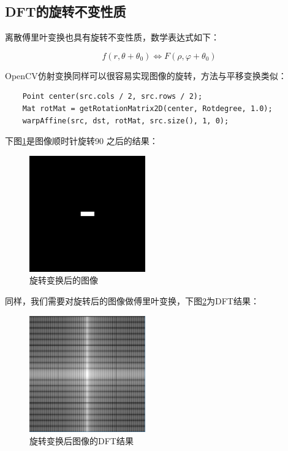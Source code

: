 \documentclass[hyperref,UTF8]{ctexart}
\begin{document}
\subsection{DFT的旋转不变性质}

离散傅里叶变换也具有旋转不变性质，数学表达式如下：

\begin{equation}
f(r,\theta + \theta_0) \Leftrightarrow F(\rho ,\varphi + \theta_0)
\end{equation}

OpenCV仿射变换同样可以很容易实现图像的旋转，方法与平移变换类似：

\begin{lstlisting}
	Point center(src.cols / 2, src.rows / 2);
	Mat rotMat = getRotationMatrix2D(center, Rotdegree, 1.0);
	warpAffine(src, dst, rotMat, src.size(), 1, 0);
\end{lstlisting}

下图\ref{fig:rotate}是图像顺时针旋转90 \textdegree 之后的结果：

\begin{figure}[H]
\centering
\includegraphics[width=5cm]{rotate.png}
\caption{旋转变换后的图像}
\label{fig:rotate}
\end{figure}

同样，我们需要对旋转后的图像做傅里叶变换，下图\ref{fig:rotateDFT}为DFT结果：

\begin{figure}[H]
\centering
\includegraphics[width=5cm]{rotateDFT.png}
\caption{旋转变换后图像的DFT结果}
\label{fig:rotateDFT}
\end{figure}
\end{document}
